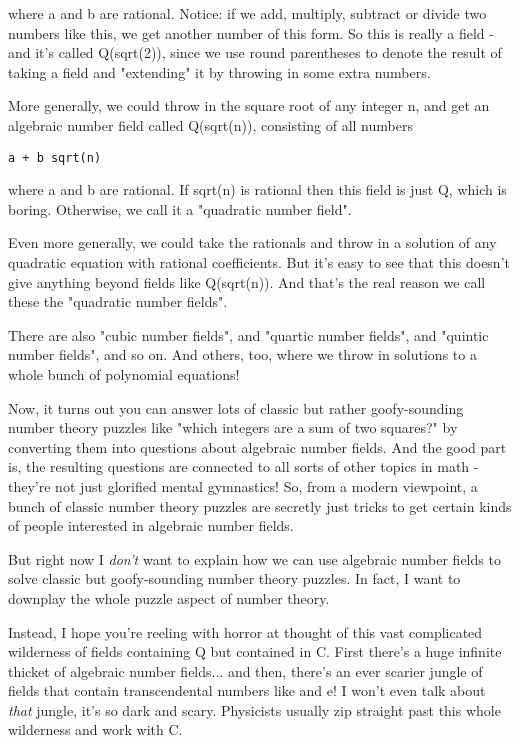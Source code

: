 where a and b are rational.  Notice: if we add, multiply, subtract or
divide two numbers like this, we get another number of this form.
So this is really a field - and it's called Q(sqrt(2)), since we use 
round parentheses to denote the result of taking a field and "extending" 
it by throwing in some extra numbers.

More generally, we could throw in the square root of any integer n, 
and get an algebraic number field called Q(sqrt(n)), consisting of all
numbers

\begin{verbatim}
a + b sqrt(n)
\end{verbatim}
    
where a and b are rational.  If sqrt(n) is rational then this field is
just Q, which is boring.  Otherwise, we call it a "quadratic number field".

Even more generally, we could take the rationals and throw in a
solution of any quadratic equation with rational coefficients.  But 
it's easy to see that this doesn't give anything beyond fields like
Q(sqrt(n)).  And that's the real reason we call these the "quadratic 
number fields".

There are also "cubic number fields", and "quartic number fields",
and "quintic number fields", and so on.  And others, too, where we
throw in solutions to a whole bunch of polynomial equations!

Now, it turns out you can answer lots of classic but rather goofy-sounding 
number theory puzzles like "which integers are a sum of two squares?" 
by converting them into questions about algebraic number fields.  
And the good part is, the resulting questions are connected to all sorts 
of other topics in math - they're not just glorified mental gymnastics!  
So, from a modern viewpoint, a bunch of classic number theory puzzles are 
secretly just tricks to get certain kinds of people interested in algebraic 
number fields.  

But right now I \emph{don't} want to explain how we can use algebraic number 
fields to solve classic but goofy-sounding number theory puzzles.
In fact, I want to downplay the whole puzzle aspect of number theory.

Instead, I hope you're reeling with horror at thought of this vast 
complicated wilderness of fields containing Q but contained in C.
First there's a huge infinite thicket of algebraic number fields...
and then, there's an ever scarier jungle of fields that contain 
transcendental numbers like \pi  and e!  I won't even talk about \emph{that}
jungle, it's so dark and scary.  Physicists usually zip straight past 
this whole wilderness and work with C.  

